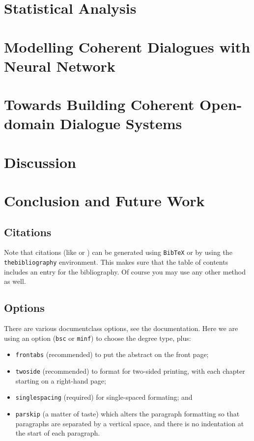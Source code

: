 \documentclass[bsc,frontabs,twoside,singlespacing,parskip,deptreport]{infthesis}     %
\begin{document}
\chapter{Statistical Analysis}

\chapter{Modelling Coherent Dialogues with Neural Network}

\chapter{Towards Building Coherent Open-domain Dialogue Systems}

\chapter{Discussion}

\chapter{Conclusion and Future Work}


\section{Citations}


Note that citations 
(like \cite{P1} or \cite{P2})
can be generated using {\tt BibTeX} or by using the
{\tt thebibliography} environment. This makes sure that the
table of contents includes an entry for the bibliography.
Of course you may use any other method as well.

\section{Options}

There are various documentclass options, see the documentation.  Here we are
using an option ({\tt bsc} or {\tt minf}) to choose the degree type, plus:
\begin{itemize}
\item {\tt frontabs} (recommended) to put the abstract on the front page;
\item {\tt twoside} (recommended) to format for two-sided printing, with
  each chapter starting on a right-hand page;
\item {\tt singlespacing} (required) for single-spaced formating; and
\item {\tt parskip} (a matter of taste) which alters the paragraph formatting so that
paragraphs are separated by a vertical space, and there is no
indentation at the start of each paragraph.
\end{itemize}







\end{document}
